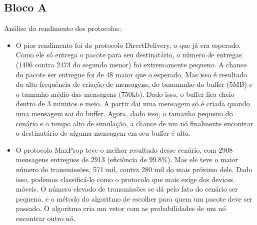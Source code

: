 \documentclass[conference]{IEEEtran}
\begin{document}
\subsection{Bloco A}
  Análise do rendimento dos protocolos:
  \begin{itemize}
    \item O pior rendimento foi do protocolo DirectDelivery, o que já era esperado. Como ele só entrega 
      o pacote para seu destinatário, o número de entregas (1406 contra 2473 do segundo menor) foi 
			extremamente pequeno.
			A chance do pacote ser entregue foi de 48%
			maior que o esperado. Mas isso é resultado da alta frequência de criação de mensagens, do tamamnho 
			do buffer (5MB) e o tamanho médio das mensagens (750kb). Dado isso, o buffer fica cheio dentro de 
			3 minutos e meio. A partir dai uma mensagem só é criada quando uma mensagem sai do buffer. Agora, 
			dado isso, o tamanho pequeno do cenário e o tempo alto de simulação, a chance de um nó finalmente 
			encontrar o destinatário de alguma mensagem em seu buffer é alta.
		\item O protocolo MaxProp teve o melhor resultado desse cenário, com 2908 mensagens entregues de 2913
			(eficiência de 99.8\%). Mas ele teve o maior número de transmissões, 571 mil, contra 280 mil do mais
			próximo dele. Dado isso, podemos classificá-lo como o protocolo que mais exige dos devices móveis.
			O número elevado de transmissões se dá pelo fato do cenário ser pequeno, e o método do algoritmo 
			de escolher para quem um pacote deve ser passado. O algoritmo cria um vetor com as probabilidades
			de um nó encontrar outro nó. 
			

\end{itemize}
\end{document}
